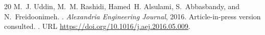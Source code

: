 \documentclass[11pt]{article}
\theoremstyle{definition}
\begin{document}
\begin{thebibliography}{20}
M.~J. Uddin, M.~M. Rashidi, Hamed~H. Alsulami, S.~Abbasbandy, and
N.~Freidoonimeh.
.
\newblock \emph{Alexandria Engineering Journal}, 2016.
\newblock Article-in-press version consulted.
\newblock {}.
\newblock URL \url{https://doi.org/10.1016/j.aej.2016.05.009}.

\end{thebibliography}
\endgroup
\end{document}
